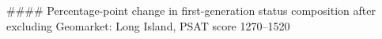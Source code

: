 #### Percentage-point change in first-generation status composition after excluding Geomarket: Long Island, PSAT score 1270–1520
